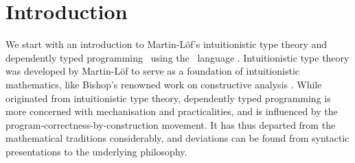 \chapter{Introduction}
\label{chap:introduction}



We start with an introduction to Martin-Löf's intuitionistic type theory \citep{ML-TT73, ML-TT84, Nordstrom-programming} and dependently typed programming~\citep{Altenkirch-why-dependent-types-matter, McBride-Epigram} using the \Agda\ language \citep{Norell-thesis, Norell-Agda, Bove-dependent-types-at-work}.
Intuitionistic type theory was developed by Martin-Löf to serve as a foundation of intuitionistic mathematics, like Bishop's renowned work on constructive analysis \citep{Bishop-analysis}.
While originated from intuitionistic type theory, dependently typed programming is more concerned with mechanisation and practicalities, and is influenced by the program-correctness-by-construction movement.
It has thus departed from the mathematical traditions considerably, and deviations can be found from syntactic presentations to the underlying philosophy.
